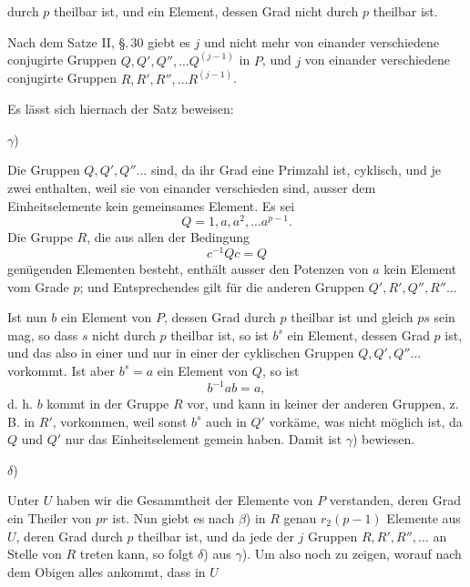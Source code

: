 durch $p$ theilbar ist, und ein Element, dessen Grad nicht durch $p$ theilbar ist.

Nach dem Satze II, \S.\,30 giebt es $j$ und nicht mehr von einander verschiedene conjugirte Gruppen $Q, Q', Q'', \ldots Q^{(j-1)}$ in $P$, und $j$ von einander verschiedene conjugirte Gruppen $R, R', R'', \ldots R^{(j-1)}$.

Es lässt sich hiernach der Satz beweisen:

$\gamma$) 

Die Gruppen $Q, Q', Q'' \ldots$ sind, da ihr Grad eine Primzahl ist, cyklisch, und je zwei enthalten, weil sie von einander verschieden sind, ausser dem Einheitselemente kein gemeinsames Element. Es sei
\[
Q = 1, a, a^2, \ldots a^{p-1}.
\]
Die Gruppe $R$, die aus allen der Bedingung
\[
c^{-1}Qc = Q
\]
genügenden Elementen besteht, enthält ausser den Potenzen von $a$ kein Element vom Grade $p$; und Entsprechendes gilt für die anderen Gruppen $Q', R', Q'', R'' \ldots$

Ist nun $b$ ein Element von $P$, dessen Grad durch $p$ theilbar ist und gleich $ps$ sein mag, so dass $s$ nicht durch $p$ theilbar ist, so ist $b^s$ ein Element, dessen Grad $p$ ist, und das also in einer und nur in einer der cyklischen Gruppen $Q, Q', Q'' \ldots$ vorkommt. Ist aber $b^s = a$ ein Element von $Q$, so ist
\[
b^{-1}ab = a,
\]
d. h. $b$ kommt in der Gruppe $R$ vor, und kann in keiner der anderen Gruppen, z. B. in $R'$, vorkommen, weil sonst $b^s$ auch in $Q'$ vorkäme, was nicht möglich ist, da $Q$ und $Q'$ nur das Einheitselement gemein haben. Damit ist $\gamma$) bewiesen.

$\delta$) 

Unter $U$ haben wir die Gesammtheit der Elemente von $P$ verstanden, deren Grad ein Theiler von $pr$ ist. Nun giebt es nach $\beta$) in $R$ genau $r_2(p-1)$ Elemente aus $U$, deren Grad durch $p$ theilbar ist, und da jede der $j$ Gruppen $R, R', R'', \ldots$ an Stelle von $R$ treten kann, so folgt $\delta$) aus $\gamma$). Um also noch zu zeigen, worauf nach dem Obigen alles ankommt, dass in $U$

